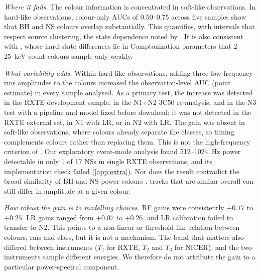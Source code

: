 \documentclass[11pt,a4paper]{article}
\begin{document}
\emph{Where it fails.} The colour information is concentrated in soft-like observations. In hard-like observations,
colour-only AUCs of 0.50--0.75 across five samples show that BH and NS colours overlap substantially. This quantifies,
with intervals that respect source clustering, the state dependence noted by \citet{Pattnaik2021}. It is also consistent
with \citet{Burke2017}, whose hard-state differences lie in Comptonization parameters that 2--25~keV count colours sample
only weakly.

\emph{What variability adds.} Within hard-like observations, adding three low-frequency rms amplitudes to the colours
increased the observation-level AUC (point estimate) in every sample analysed. As a primary test, the increase was
detected in the RXTE development sample, in the N1+N2 3C50 re-analysis, and in the N3 test with a pipeline and model
fixed before download; it was not detected in the RXTE external set, in N1 with LR, or in N2 with LR. The gain was absent in soft-like observations, where colours already separate the classes, so
timing complements colours rather than replacing them. This is not the high-frequency criterion of
\citet{SunyaevRevnivtsev2000}. Our exploratory event-mode analysis found 512--1024~Hz power detectable in only 1 of 17 NSs
in single RXTE observations, and its implementation check failed (\cref{app:extra}). Nor does the result contradict the
broad similarity of BH and NS power colours \citep{Heil2015,GardenierUttley2018}: tracks that are similar overall can
still differ in amplitude at a given colour.

\emph{How robust the gain is to modelling choices.} RF gains were consistently $+0.17$ to $+0.25$. LR gains ranged from
$+0.07$ to $+0.26$, and LR calibration failed to transfer to N2. This points to a non-linear or threshold-like relation
between colours, rms and class, but it is not a mechanism. The band that matters also differed between instruments ($T_1$
for RXTE, $T_2$ and $T_3$ for NICER), and the two instruments sample different energies. We therefore do not attribute the
gain to a particular power-spectral component.
\end{document}
